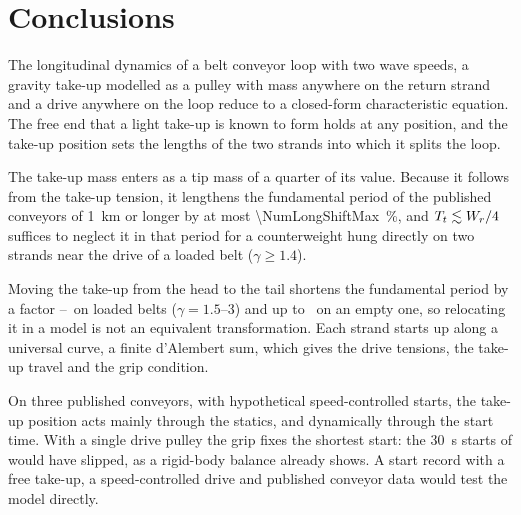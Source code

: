 \section{Conclusions}\label{sec:conclusions}

The longitudinal dynamics of a belt conveyor loop with two wave speeds, a gravity take-up
modelled as a pulley with mass anywhere on the return strand and a drive anywhere on the loop
reduce to a closed-form characteristic equation. The free end that a light take-up is known to
form holds at any position, and the take-up position sets the lengths of the two strands into
which it splits the loop.

The take-up mass enters as a tip mass of a quarter of its value. Because it follows from the
take-up tension, it lengthens the fundamental period of the published conveyors of
\qty{1}{\kilo\metre} or longer by at most \qty{\NumLongShiftMax}{\percent}, and
$T_t\lesssim W_r/4$ suffices to neglect it in that period for a counterweight hung directly on
two strands near the drive of a loaded belt ($\gamma\ge1.4$).

Moving the take-up from the head to the tail shortens the fundamental period by a factor
\NumHeadTailRatioGammaThree--\NumHeadTailRatioGammaOneFive\ on loaded belts ($\gamma=1.5$--3)
and up to
\NumHeadTailRatioGammaOne\ on an empty one, so relocating it in a model is not an equivalent
transformation. Each strand starts up along a universal curve, a finite d'Alembert sum, which
gives the drive tensions, the take-up travel and the grip condition.

On three published conveyors, with hypothetical speed-controlled starts, the take-up position
acts mainly through the statics, and dynamically through the start time. With a single drive
pulley the grip fixes the shortest start: the \qty{30}{\second} starts of \citet{lodewijks1996}
would have slipped, as a rigid-body balance already shows. A start record with a free take-up,
a speed-controlled drive and published conveyor data would test the model directly.
